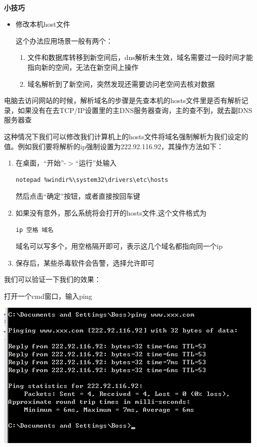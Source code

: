 \documentclass{article}
\begin{document}
\paragraph{}\textbf{小技巧}\\

\begin{itemize}
\item 修改本机host文件

这个办法应用场景一般有两个：

 \begin{enumerate}
 \item 文件和数据库转移到新空间后，dns解析未生效，域名需要过一段时间才能指向新的空间，无法在新空间上操作
 \item 域名解析到了新空间，突然发现还需要访问老空间去核对数据
 \end{enumerate}
\end{itemize}

电脑去访问网站的时候，解析域名的步骤是先查本机的hosts文件里是否有解析记录，如果没有在去TCP/IP设置里的主DNS服务器查询，主的查不到，就去副DNS服务器查

这种情况下我们可以修改我们计算机上的hosts文件将域名强制解析为我们设定的值。例如我们要将解析的ip强制设置为222.92.116.92，其操作方法如下：

 \begin{enumerate}
 \item 在桌面，“开始”-$>$“运行”处输入
\begin{verbatim}
notepad %windir%\system32\drivers\etc\hosts
\end{verbatim}
然后点击“确定”按钮，或者直接按回车键

 \item 如果没有意外，那么系统将会打开的hosts文件,这个文件格式为
\begin{verbatim}
ip 空格 域名
\end{verbatim}
域名可以写多个，用空格隔开即可，表示这几个域名都指向同一个ip

 \item 保存后，某些杀毒软件会告警，选择允许即可
 \end{enumerate}

我们可以验证一下我们的效果：

打开一个cmd窗口，输入ping 

\includegraphics{img/service/dailyop/mig/4.png}
\end{document}
